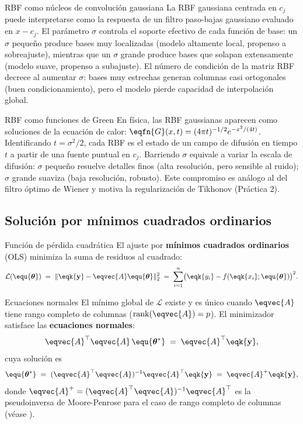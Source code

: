 \begin{observacion}{RBF como núcleos de convolución gaussiana}
La RBF gaussiana centrada en $c_j$ puede interpretarse como la respuesta
de un filtro paso-bajas gaussiano evaluado en $x - c_j$. El parámetro
$\sigma$ controla el soporte efectivo de cada función de base: un $\sigma$
pequeño produce bases muy localizadas (modelo altamente local, propenso
a sobreajuste), mientras que un $\sigma$ grande produce bases que solapan
extensamente (modelo suave, propenso a subajuste). El número de condición
de la matriz RBF decrece al aumentar $\sigma$: bases muy estrechas generan
columnas casi ortogonales (buen condicionamiento), pero el modelo pierde
capacidad de interpolación global.
\end{observacion}

\begin{fisicaconexion}{RBF como funciones de Green}
En física, las RBF gaussianas aparecen como soluciones de la ecuación de calor:
$\eqfn{G}(x,t) = (4\pi t)^{-1/2} e^{-x^2/(4t)}$. Identificando $t = \sigma^2/2$, cada RBF
es el estado de un campo de difusión en tiempo $t$ a partir de una fuente puntual
en $c_j$. Barriendo $\sigma$ equivale a variar la escala de difusión: $\sigma$ pequeño
resuelve detalles finos (alta resolución, pero sensible al ruido); $\sigma$ grande
suaviza (baja resolución, robusto). Este compromiso es análogo al del filtro óptimo
de Wiener y motiva la regularización de Tikhonov (Práctica 2).
\end{fisicaconexion}

\subsection*{Solución por mínimos cuadrados ordinarios}
\label{sec:minimos_cuadrados}

\begin{definicion}{Función de pérdida cuadrática}
\label{def:perdida_cuadratica}
El ajuste por \textbf{mínimos cuadrados ordinarios} (OLS) minimiza la
suma de residuos al cuadrado:
\[
  \mathcal{L}(\equ{\boldsymbol{\theta}}) \;=\;
  \|\eqk{\mathbf{y}} - \eqvec{A}\equ{\boldsymbol{\theta}}\|_2^2
  \;=\; \sum_{i=1}^n \bigl(\eqk{y_i} - f(\eqk{x_i};\equ{\boldsymbol{\theta}})\bigr)^2.
\]
\end{definicion}

\begin{teorema}{Ecuaciones normales}
\label{thm:ecuaciones_normales}
El mínimo global de $\mathcal{L}$ existe y es único cuando $\eqvec{A}$
tiene rango completo de columnas ($\mathrm{rank}(\eqvec{A}) = p$). El
minimizador satisface las \textbf{ecuaciones normales}:
\[
  \eqvec{A}^\top\eqvec{A}\,\equ{\boldsymbol{\theta}^*}
  \;=\; \eqvec{A}^\top\eqk{\mathbf{y}},
\]
cuya solución es
\[
  \equ{\boldsymbol{\theta}^*}
  \;=\; (\eqvec{A}^\top\eqvec{A})^{-1}\eqvec{A}^\top\eqk{\mathbf{y}}
  \;=\; \eqvec{A}^+\eqk{\mathbf{y}},
\]
donde $\eqvec{A}^+ = (\eqvec{A}^\top\eqvec{A})^{-1}\eqvec{A}^\top$ es
la pseudoinversa de Moore-Penrose para el caso de rango completo de columnas
(véase ).
\end{teorema}


